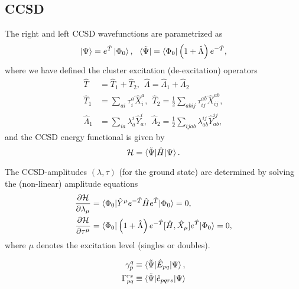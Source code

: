 \documentclass{article}
\begin{document}
\subsection{CCSD}
The right and left CCSD wavefunctions are parametrized as 
\begin{align}
    \ket{\Psi} = e^{\hat{T}}\ket{\Phi_0}, \ \ \bra{\tilde{\Psi}} = \bra{\Phi_0}\left(1+\hat{\Lambda} \right)e^{-\hat{T}},
\end{align}
where we have defined the cluster excitation (de-excitation) operators
\begin{align}
    \hat{T} &= \hat{T}_1 + \hat{T}_2, \ \
    \hat{\Lambda} = \hat{\Lambda}_1 + \hat{\Lambda}_2 \\
    \hat{T}_1 &= \sum_{ai} \tau^a_i \hat{X}^a_i, \ \  \hat{T}_2 = \frac{1}{2} \sum_{abij} \tau^{ab}_{ij} \hat{X}^{ab}_{ij}, \\
    \hat{\Lambda}_1 &= \sum_{ia} \lambda^i_a \hat{Y}^i_a, \ \ \hat{\Lambda}_2 = \frac{1}{2} \sum_{ijab} \lambda^{ij}_{ab} \hat{Y}^{ij}_{ab},
\end{align}
and the CCSD energy functional is given by
\begin{equation}
    \mathcal{H} = \braket{\tilde{\Psi}|\hat{H}|\Psi}.
\end{equation}

The CCSD-amplitudes $(\lambda, \tau)$ (for the ground state) are determined by solving the (non-linear) amplitude equations
\begin{align}
    \frac{\partial \mathcal{H}}{\partial \lambda_\mu} &= \braket{\Phi_0|\hat{Y}^\mu e^{-\hat{T}} \hat{H}e^{\hat{T}}|\Phi_0} = 0, \\
    \frac{\partial \mathcal{H}}{\partial \tau^\mu} &= \braket{\Phi_0|\left(1+\hat{\Lambda}\right)e^{-\hat{T}}[\hat{H}, \hat{X}_\mu]e^{\hat{T}}|\Phi_0} = 0,
\end{align}
where $\mu$ denotes the excitation level (singles or doubles).

\begin{align}
    \gamma_p^q &\equiv \braket{\tilde{\Psi}|\hat{E}_{pq}|\Psi}, \\
    \Gamma_{pq}^{rs} &\equiv \braket{\tilde{\Psi}|\hat{e}_{pqrs}|\Psi}
\end{align}
\end{document}
